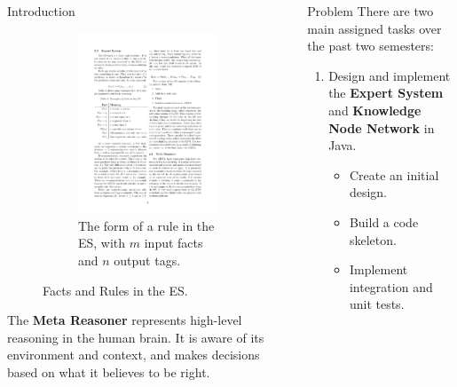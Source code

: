 \documentclass[final]{beamer} %
\newlength{\columnheight}
\begin{document}
\begin{frame}
\begin{columns}
\begin{column}{.33\textwidth}
{\begin{block}{Introduction}
{\begin{figure}[!htb]
\begin{subfigure}[!htb]{0.58\columnwidth}
							\includegraphics[width=\columnwidth]{figures/rule.pdf}
							\caption{The form of a rule in the ES, with $m$ input facts and $n$ output tags.}
						\end{subfigure}
						\caption{Facts and Rules in the ES.}
					\end{figure}
					
					
					The \textbf{Meta Reasoner} represents high-level reasoning in the human brain. It is aware of its environment and context, and makes decisions based on what it believes to be right.}
				\end{block}
			}
			\end{column}
			\begin{column}{.33\textwidth}
				\parbox[t][\columnheight]{\textwidth}{
				
				\begin{block}{Problem}
					There are two main assigned tasks over the past two semesters:
					\begin{enumerate}
						\item Design and implement the \textbf{Expert System} and \textbf{Knowledge Node Network} in Java.
						\begin{itemize}
							\item Create an initial design.
							\item Build a code skeleton.
							\item Implement integration and unit tests.
						\end{itemize}
						

\end{enumerate}
\end{block}}
\end{column}
\end{columns}
\end{frame}
\end{document}
